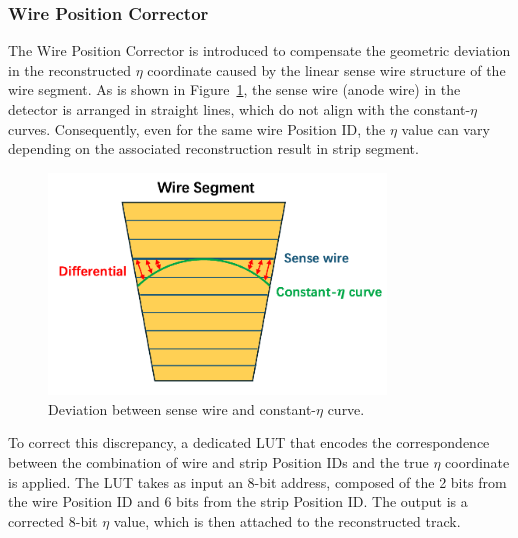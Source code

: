 \subsubsection{Wire Position Corrector}

The Wire Position Corrector is introduced to compensate the geometric deviation in the reconstructed \(\eta\) coordinate caused by the linear sense wire structure of the wire segment. As is shown in Figure~\ref{fig:wire_corr}, the sense wire (anode wire) in the detector is arranged in straight lines, which do not align with the constant-\(\eta\) curves. Consequently, even for the same wire Position ID, the \(\eta\) value can vary depending on the associated reconstruction result in strip segment.

\begin{figure}[htbp]
  \centering
  \includegraphics[width=0.8\textwidth]{figs/chapter5/wire_corr_new.png}
  \caption{Deviation between sense wire and constant-\(\eta\) curve.}
  \label{fig:wire_corr}
\end{figure}

To correct this discrepancy, a dedicated LUT that encodes the correspondence between the combination of wire and strip Position IDs and the true \(\eta\) coordinate is applied. The LUT takes as input an 8-bit address, composed of the 2 bits from the wire Position ID and 6 bits from the strip Position ID. The output is a corrected 8-bit \(\eta\) value, which is then attached to the reconstructed track.

